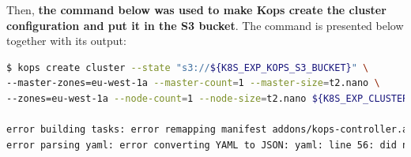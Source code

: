 Then, \textbf{the command below was used to make Kops create the cluster configuration and put it in the S3 bucket}. The command is presented below together with its output:
\begin{lstlisting}[basicstyle=\tiny,caption={Command used to make Kops create the cluster configuration and put it in the S3 bucket},captionpos=b,language=Bash,xleftmargin=1cm]
$ kops create cluster --state "s3://${K8S_EXP_KOPS_S3_BUCKET}" \
--master-zones=eu-west-1a --master-count=1 --master-size=t2.nano \
--zones=eu-west-1a --node-count=1 --node-size=t2.nano ${K8S_EXP_CLUSTER_NAME}

error building tasks: error remapping manifest addons/kops-controller.addons.k8s.io/k8s-1.16.yaml: \
error parsing yaml: error converting YAML to JSON: yaml: line 56: did not find expected alphabetic or numeric character
\end{lstlisting}


